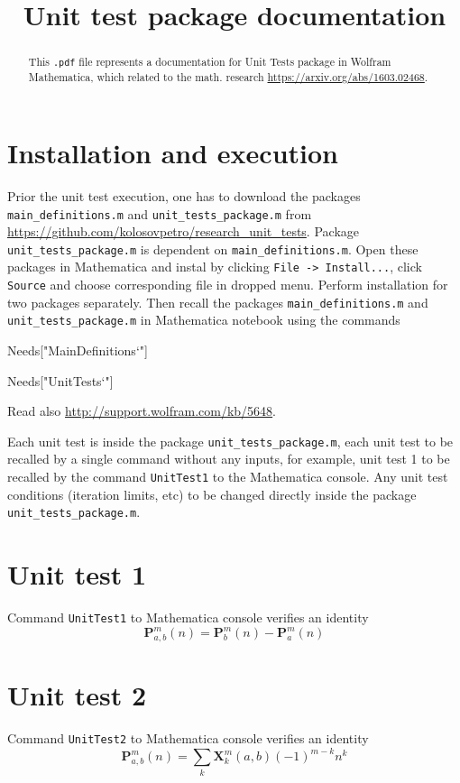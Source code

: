 \documentclass[12pt, letterpaper]{amsart}
\title{Unit test package documentation}
\theoremstyle{definition}
\theoremstyle{remark}
\numberwithin{equation}{section}
\begin{document}
\begin{abstract}
This \verb".pdf" file represents a documentation for Unit Tests package in Wolfram Mathematica, which related to the math. research 
\href{https://arxiv.org/abs/1603.02468}{\textsf{https://arxiv.org/abs/1603.02468}}.
\end{abstract}
\maketitle
\tableofcontents
\section*{Installation and execution}
Prior the unit test execution, one has to download the packages \verb"main_definitions.m" and \verb"unit_tests_package.m" from \href{https://github.com/KolosovPetro/research_unit_tests}{\textsf{https://github.com/kolosovpetro/research\_unit\_tests}}. Package \verb"unit_tests_package.m" is dependent on \verb"main_definitions.m". Open these packages in Mathematica and instal by clicking \verb"File -> Install...", click \verb"Source" and choose corresponding file in dropped menu. Perform installation for two packages separately. Then recall the packages \verb"main_definitions.m" and \verb"unit_tests_package.m" in Mathematica notebook using the commands
\begin{center}
\textsf{Needs["MainDefinitions`"]}
\end{center}
\begin{center}
\textsf{Needs["UnitTests`"]}
\end{center}
Read also \href{http://support.wolfram.com/kb/5648}{\textsf{http://support.wolfram.com/kb/5648}}.

Each unit test is inside the package \verb"unit_tests_package.m", each unit test to be recalled by a single command without any inputs, for example, unit test 1 to be recalled by the command \verb"UnitTest1" to the Mathematica console. Any unit test conditions (iteration limits, etc) to be changed directly inside the package  \verb"unit_tests_package.m".
\section*{Unit test 1}
Command \verb"UnitTest1" to Mathematica console verifies an identity 
\begin{equation*}
\mathbf{P}^{m}_{a,b}(n) = \mathbf{P}^{m}_{b}(n)-\mathbf{P}^{m}_{a}(n)
\end{equation*}
\section*{Unit test 2}
Command \verb"UnitTest2" to Mathematica console verifies an identity 
\begin{equation*}
\mathbf{P}^{m}_{a,b}(n) = \sum_{k}\mathbf{X}^{m}_{k}(a,b) (-1)^{m-k} n^k
\end{equation*}
\end{document}
